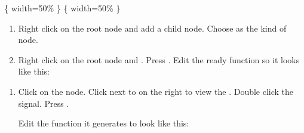 \documentclass[letterpaper,10pt,english]{sphinxmanual}
\begin{document}
\sphinxAtStartPar
{}\{ width=50\% \}
\{ width=50\% \}
\begin{enumerate}
%
\item {} 
\sphinxAtStartPar
Right click on the root node and add a child node.  Choose  as the kind of node.

\item {} 
\sphinxAtStartPar
Right click on the root node and .  Press .  Edit the ready
function so it looks like this:

\end{enumerate}

\begin{sphinxVerbatim}[commandchars=\\\{\}]
 
\end{sphinxVerbatim}
\begin{enumerate}
%
\item {} 
\sphinxAtStartPar
Click on the  node.  Click  next to  on the right to view the
.  Double click the  signal.  Press .

\sphinxAtStartPar
Edit the function it generates to look like this:

\end{enumerate}
\end{document}
